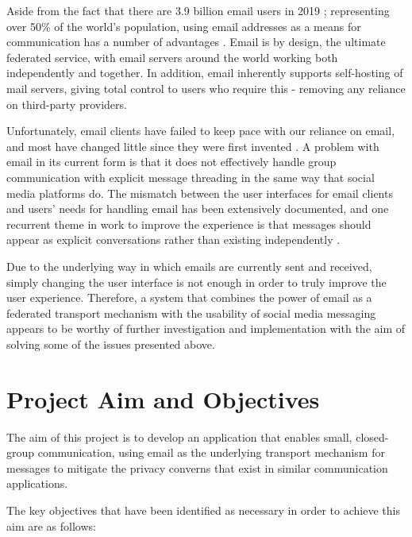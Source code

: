 Aside from the fact that there are 3.9 billion email users in 2019 \cite{radicati2019}; representing over 50\% of the world's population, using email addresses as a means for communication has a number of advantages \cite{hanson2011}. Email is by design, the ultimate federated service, with email servers around the world working both independently and together. In addition, email inherently supports self-hosting of mail servers, giving total control to users who require this - removing any reliance on third-party providers.

Unfortunately, email clients have failed to keep pace with our reliance on email, and most have changed little since they were first invented \cite{rohall2004}. A problem with email in its current form is that it does not effectively handle group communication with explicit message threading in the same way that social media platforms do. The mismatch between the user interfaces for email clients and users' needs for handling email has been extensively documented, and one recurrent theme in work to improve the experience is that messages should appear as explicit conversations rather than existing independently \cite{venolia2003}.

Due to the underlying way in which emails are currently sent and received, simply changing the user interface is not enough in order to truly improve the user experience. Therefore, a system that combines the power of email as a federated transport mechanism with the usability of social media messaging appears to be worthy of further investigation and implementation with the aim of solving some of the issues presented above. 

\section{Project Aim and Objectives}

The aim of this project is to develop an application that enables small, closed-group communication, using email as the underlying transport mechanism for messages to mitigate the privacy converns that exist in similar communication applications.

The key objectives that have been identified as necessary in order to achieve this aim are as follows:

